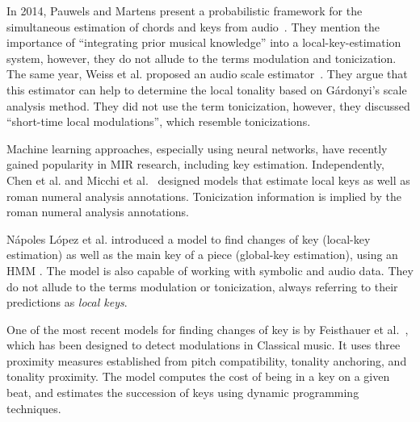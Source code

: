 In 2014, Pauwels and Martens present a probabilistic
framework for the simultaneous estimation of chords and keys
from audio~\parencite{pauwels2014combining}. They mention
the importance of ``integrating prior musical knowledge''
into a local-key-estimation system, however, they do not
allude to the terms modulation and tonicization. The same
year, Weiss et al. proposed an audio scale
estimator~\parencite{weiss2014chroma}. They argue that this
estimator can help to determine the local tonality based on
G\'{a}rdonyi's scale analysis method. They did not use the
term tonicization, however, they discussed ``short-time
local modulations'', which resemble tonicizations.

Machine learning approaches, especially using neural
networks, have recently gained popularity in MIR research,
including key estimation. Independently, Chen et al.
\parencite{chen18harmony,chen19harmony} and Micchi et
al.~\parencite{micchi20roman} designed models that estimate
local keys as well as roman numeral analysis annotations.
Tonicization information is implied by the roman numeral
analysis annotations.

N\'apoles L\'opez et al. introduced a model to find changes
of key (local-key estimation) as well as the main key of a
piece (global-key estimation), using an HMM
\parencite{napoleslopez2019key}. The model is also capable
of working with symbolic and audio data. They do not allude
to the terms modulation or tonicization, always referring to
their predictions as \emph{local keys}.

One of the most recent models for finding changes of key is
by Feisthauer et al.~\parencite{feisthauer2020smc}, which
has been designed to detect modulations in Classical music.
It uses three proximity measures established from pitch
compatibility, tonality anchoring, and tonality proximity.
The model computes the cost of being in a key on a given
beat, and estimates the succession of keys using dynamic
programming techniques.




